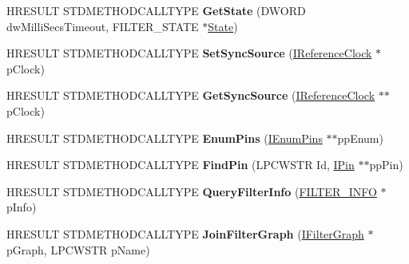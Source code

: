 \begin{DoxyCompactItemize}
H\+R\+E\+S\+U\+LT S\+T\+D\+M\+E\+T\+H\+O\+D\+C\+A\+L\+L\+T\+Y\+PE {\bfseries Get\+State} (D\+W\+O\+RD dw\+Milli\+Secs\+Timeout, F\+I\+L\+T\+E\+R\+\_\+\+S\+T\+A\+TE $\ast$\hyperlink{struct_state}{State})
\item 
\mbox{\label{class_c_network_provider_add7d20f9e99ff39fd4f1eda683aef9b6}} 
H\+R\+E\+S\+U\+LT S\+T\+D\+M\+E\+T\+H\+O\+D\+C\+A\+L\+L\+T\+Y\+PE {\bfseries Set\+Sync\+Source} (\hyperlink{interface_i_reference_clock}{I\+Reference\+Clock} $\ast$p\+Clock)
\item 
\mbox{\label{class_c_network_provider_a95d1ce8170add8704cfb711651a0d437}} 
H\+R\+E\+S\+U\+LT S\+T\+D\+M\+E\+T\+H\+O\+D\+C\+A\+L\+L\+T\+Y\+PE {\bfseries Get\+Sync\+Source} (\hyperlink{interface_i_reference_clock}{I\+Reference\+Clock} $\ast$$\ast$p\+Clock)
\item 
\mbox{\label{class_c_network_provider_a1dc0d5001e77ff3e7b33a902b685bfee}} 
H\+R\+E\+S\+U\+LT S\+T\+D\+M\+E\+T\+H\+O\+D\+C\+A\+L\+L\+T\+Y\+PE {\bfseries Enum\+Pins} (\hyperlink{interface_i_enum_pins}{I\+Enum\+Pins} $\ast$$\ast$pp\+Enum)
\item 
\mbox{\label{class_c_network_provider_a6ba3789d49a9dcbe01a2794b3aa30875}} 
H\+R\+E\+S\+U\+LT S\+T\+D\+M\+E\+T\+H\+O\+D\+C\+A\+L\+L\+T\+Y\+PE {\bfseries Find\+Pin} (L\+P\+C\+W\+S\+TR Id, \hyperlink{interface_i_pin}{I\+Pin} $\ast$$\ast$pp\+Pin)
\item 
\mbox{\label{class_c_network_provider_a792a9b49b36893f306c36f15a2ca9441}} 
H\+R\+E\+S\+U\+LT S\+T\+D\+M\+E\+T\+H\+O\+D\+C\+A\+L\+L\+T\+Y\+PE {\bfseries Query\+Filter\+Info} (\hyperlink{struct_i_base_filter_1_1___filter_info}{F\+I\+L\+T\+E\+R\+\_\+\+I\+N\+FO} $\ast$p\+Info)
\item 
\mbox{\label{class_c_network_provider_ac32353edaa379009924dec762dd87aed}} 
H\+R\+E\+S\+U\+LT S\+T\+D\+M\+E\+T\+H\+O\+D\+C\+A\+L\+L\+T\+Y\+PE {\bfseries Join\+Filter\+Graph} (\hyperlink{interface_i_filter_graph}{I\+Filter\+Graph} $\ast$p\+Graph, L\+P\+C\+W\+S\+TR p\+Name)
\item 
\mbox{\label{class_c_network_provider_aa94f9e0492b125b6db7d782a0bb88108}} 
$$
\end{DoxyCompactItemize}
